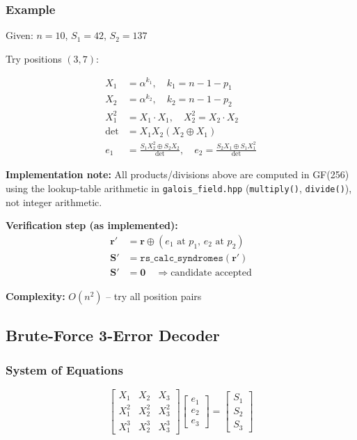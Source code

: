 \documentclass[11pt,a4paper]{article}
\begin{document}
\subsubsection{Example}

Given: $n=10$, $S_1 = 42$, $S_2 = 137$

Try positions $(3, 7)$:

\begin{align}
X_1 &= \alpha^{k_1},\quad k_1 = n-1-p_1 \\
X_2 &= \alpha^{k_2},\quad k_2 = n-1-p_2 \\
X_1^2 &= X_1 \cdot X_1,\quad X_2^2 = X_2 \cdot X_2 \\
\det &= X_1 X_2 (X_2 \oplus X_1) \\
e_1 &= \frac{S_1 X_2^2 \oplus S_2 X_2}{\det},\quad
e_2 = \frac{S_2 X_1 \oplus S_1 X_1^2}{\det}
\end{align}

\textbf{Implementation note:}
All products/divisions above are computed in GF(256) using the lookup-table arithmetic in \texttt{galois\_field.hpp} (\texttt{multiply()}, \texttt{divide()}), not integer arithmetic.

\textbf{Verification step (as implemented):}
\begin{align}
\mathbf{r}' &= \mathbf{r} \oplus (e_1 \text{ at } p_1,\, e_2 \text{ at } p_2) \\
\mathbf{S}' &= \texttt{rs\_calc\_syndromes}(\mathbf{r}') \\
\mathbf{S}' &= \mathbf{0} \quad \Rightarrow \text{candidate accepted}
\end{align}

\textbf{Complexity:} $O(n^2)$ -- try all position pairs

\subsection{Brute-Force 3-Error Decoder}

\subsubsection{System of Equations}

\begin{equation}
\begin{bmatrix} X_1 & X_2 & X_3 \\ X_1^2 & X_2^2 & X_3^2 \\ X_1^3 & X_2^3 & X_3^3 \end{bmatrix}
\begin{bmatrix} e_1 \\ e_2 \\ e_3 \end{bmatrix} =
\begin{bmatrix} S_1 \\ S_2 \\ S_3 \end{bmatrix}
\end{equation}
\end{document}
